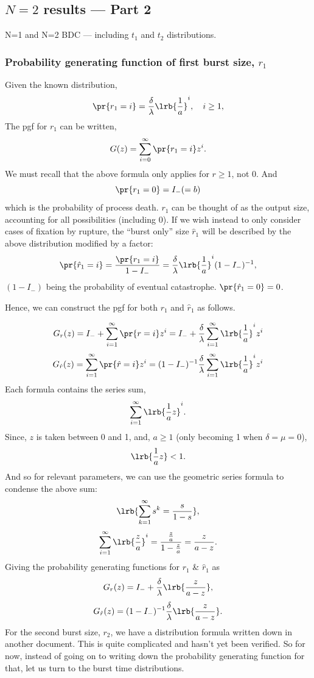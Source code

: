 \subsection{$N = 2$ results --- Part 2}










N=1 and N=2 BDC --- including $t_1$ and $t_2$ distributions.


 \subsubsection*{Probability generating function of first burst size, $r_1$}
 Given the known distribution, 
 $$\pr{r_1=i} = \frac{\delta}{\lambda}\lrb{\frac{1}{a}}^i, \quad i\geq1,$$
 The pgf for $r_1$ can be written, 
 $$G(z) = \sum^{\infty}_{i=0} \pr{r_1=i}  z^i.$$
We must recall that the above formula only applies for $r\geq1$, not 0. And 
$$\pr{r_1 = 0} = I_- (=b) $$
which is the probability of process death. $r_1$ can be thought of as the output size, accounting for all possibilities (including 0). If we wish instead to only consider cases of fixation by rupture, the ``burst only'' size $\hat r_1$ will be described by the above distribution modified by a factor:
$$\pr{\hat r_1 = i} = \frac{\pr{r_1 = i}}{1- I_-} = \frac{\delta}{\lambda}\lrb{\frac{1}{a}}^i (1-I_-)^{-1},$$
$(1-I_-)$ being the probability of eventual catastrophe. $\pr{\hat r_1 = 0} = 0$.\par
Hence, we can construct the pgf for both $r_1$ and $\hat r_1$ as follows. 

$$G_r(z) = I_- + \sum^{\infty}_{i=1} \pr{r=i} z^i = I_- + \frac{\delta}{\lambda}  \sum^{\infty}_{i=1} \lrb{\frac{1}{a}}^i z^i$$
$$G_{\hat r}(z) = \sum^{\infty}_{i=1} \pr{\hat r=i} z^i = (1 - I_-)^{-1} \frac{\delta}{\lambda}  \sum^{\infty}_{i=1} \lrb{\frac{1}{a}}^i z^i$$
Each formula contains the series sum,
$$\sum^{\infty}_{i=1} \lrb{\frac{1}{a} z}^i.$$
Since, $z$ is taken between 0 and 1, and, $a \geq 1$ (only becoming 1 when $\delta = \mu = 0$), 
$$\lrb{\frac{1}{a} z} < 1.$$
And so for relevant parameters, we can use the geometric series formula to condense the above sum:
$$\lrb{\sum_{k=1}^\infty s^k  = \frac{s}{1-s}},$$ 
$$\sum^\infty_{i=1}\lrb{\frac{z}{a}}^i = \frac{\frac{z}{a}}{1 - \frac{z}{a}} = \frac{z}{a-z}.$$
Giving the probability generating functions for $r_1$ \& $\hat r_1$ as 
$$G_r(z) =  I_- + \frac{\delta}{\lambda} \lrb{\frac{z}{a-z}},$$
$$G_{\hat r}(z) = (1 - I_-)^{-1} \frac{\delta}{\lambda} \lrb{\frac{z}{a-z}}.$$
For the second burst size, $r_2$, we have a distribution formula written down in another document. This is quite complicated and hasn't yet been verified. So for now, instead of going on to writing down the probability generating function for that, let us turn to the burst time distributions. 

